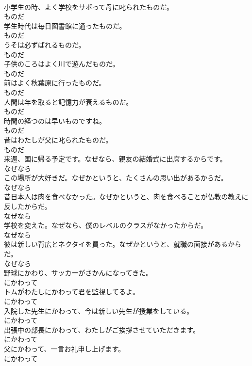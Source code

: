 \documentclass[8pt]{extreport}
\begin{document}
\begin{CJK}{UTF8}{min}
\\	小学生の時、よく学校をサボって母に叱られたものだ。	
\\	ものだ
\\	学生時代は毎日図書館に通ったものだ。	
\\	ものだ
\\	うそは必ずばれるものだ。	
\\	ものだ
\\	子供のころはよく川で遊んだものだ。	
\\	ものだ
\\	前はよく秋葉原に行ったものだ。	
\\	ものだ
\\	人間は年を取ると記憶力が衰えるものだ。	
\\	ものだ
\\	時間の経つのは早いものですね。	
\\	ものだ
\\	昔はわたしが父に叱られたものだ。	
\\	ものだ
\\	来週、国に帰る予定です。なぜなら、親友の結婚式に出席するからです。	
\\	なぜなら
\\	この場所が大好きだ。なぜかというと、たくさんの思い出があるからだ。	
\\	なぜなら
\\	昔日本人は肉を食べなかった。なぜかというと、肉を食べることが仏教の教えに反したからだ。	
\\	なぜなら
\\	学校を変えた。なぜなら、僕のレベルのクラスがなかったからだ。	
\\	なぜなら
\\	彼は新しい背広とネクタイを買った。なぜかというと、就職の面接があるからだ。	
\\	なぜなら
\\	野球にかわり、サッカーがさかんになってきた。	
\\	にかわって
\\	トムがわたしにかわって君を監視してるよ。	
\\	にかわって
\\	入院した先生にかわって、今は新しい先生が授業をしている。	
\\	にかわって
\\	出張中の部長にかわって、わたしがご挨拶させていただきます。	
\\	にかわって
\\	父にかわって、一言お礼申し上げます。	
\\	にかわって

\end{CJK}
\end{document}
